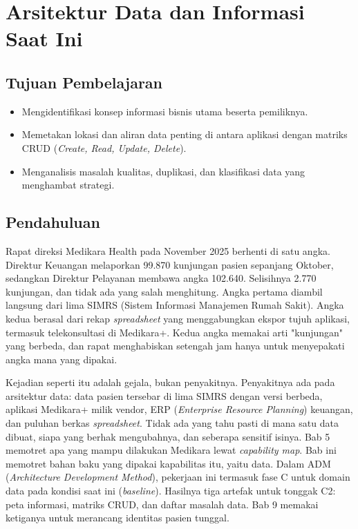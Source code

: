 \chapter{Arsitektur Data dan Informasi Saat Ini}

\section*{Tujuan Pembelajaran}
\begin{itemize}
  \item Mengidentifikasi konsep informasi bisnis utama beserta pemiliknya.
  \item Memetakan lokasi dan aliran data penting di antara aplikasi dengan matriks
        CRUD (\textit{Create, Read, Update, Delete}).
  \item Menganalisis masalah kualitas, duplikasi, dan klasifikasi data yang
        menghambat strategi.
\end{itemize}

\section{Pendahuluan}

Rapat direksi Medikara Health pada November 2025 berhenti di satu angka.
Direktur Keuangan melaporkan 99.870 kunjungan pasien sepanjang Oktober,
sedangkan Direktur Pelayanan membawa angka 102.640. Selisihnya 2.770
kunjungan, dan tidak ada yang salah menghitung. Angka pertama diambil langsung
dari lima SIMRS (Sistem Informasi Manajemen Rumah Sakit). Angka kedua berasal
dari rekap \textit{spreadsheet} yang menggabungkan ekspor tujuh aplikasi, termasuk
telekonsultasi di Medikara+. Kedua angka memakai arti "kunjungan" yang
berbeda, dan rapat menghabiskan setengah jam hanya untuk menyepakati angka
mana yang dipakai.

Kejadian seperti itu adalah gejala, bukan penyakitnya. Penyakitnya ada pada
arsitektur data: data pasien tersebar di lima SIMRS dengan versi berbeda,
aplikasi Medikara+ milik vendor, ERP (\textit{Enterprise Resource Planning})
keuangan, dan puluhan berkas \textit{spreadsheet}. Tidak ada yang tahu pasti di
mana satu data dibuat, siapa yang berhak mengubahnya, dan seberapa sensitif
isinya. Bab 5 memotret apa yang mampu dilakukan Medikara lewat
\textit{capability map}. Bab ini memotret bahan baku yang dipakai kapabilitas
itu, yaitu data. Dalam ADM (\textit{Architecture Development Method}), pekerjaan
ini termasuk fase C untuk domain data pada kondisi saat ini (\textit{baseline}).
Hasilnya tiga artefak untuk tonggak C2: peta informasi, matriks CRUD, dan
daftar masalah data. Bab 9 memakai ketiganya untuk merancang identitas pasien
tunggal.


